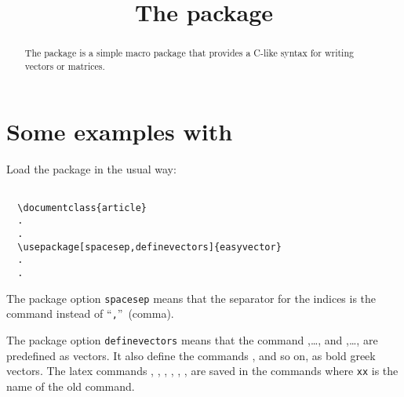 \documentclass[a4paper]{article}
\title{The package \package{easyvector}}
\begin{document}
\maketitle
\begin{abstract}
The  package is a simple
macro package that provides a C-like syntax for writing vectors or matrices.
\end{abstract}

\tableofcontents
\clearpage
\pagestyle{fpage}

\def\sectionmark#1{\markboth{The package \package{easyvector}}{The package \package{easyvector}}}
\let\chaptermark\sectionmark
\let\subsectionmark\sectionmark

\section{Some examples with }
Load the package in the usual way:
\begin{verbatim}

  \documentclass{article}
  .
  .
  \usepackage[spacesep,definevectors]{easyvector}
  .
  .

\end{verbatim}
%
The package option \texttt{spacesep} means that the separator for the
indices is the command  instead of
``\verb|,|''~(comma).

The package option \texttt{definevectors} means that the command
,\ldots,  and ,\ldots,
 are predefined as vectors.  It also define the commands
,  and so on, as bold greek vectors. 
The latex commands , , ,
, , ,  are saved in
the commands  where \verb'xx' is the name of the old
command.
\end{document}
